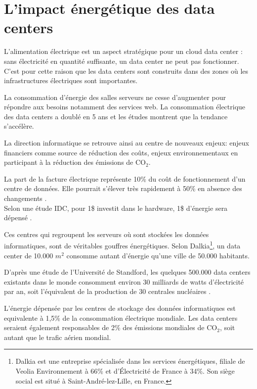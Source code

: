 \section{L'impact énergétique des data centers}
\begin{onehalfspace}
L'alimentation électrique est un aspect stratégique pour un cloud data center : sans électricité en quantité suffisante, un data center ne peut pas fonctionner. C'est pour cette raison que les data centers sont construits dans des zones où les infrastructures électriques sont importantes.\medskip 

La consommation d'énergie des salles serveurs ne cesse d'augmenter pour répondre aux besoins notamment des services web. La consommation électrique des data centers a doublé en 5 ans et les études montrent que la tendance s'accélère.\medskip 

La direction informatique se retrouve ainsi au centre de nouveaux enjeux: enjeux financiers comme source de réduction des coûts, enjeux environnementaux en participant à la réduction des émissions de CO$_{2}$. \medskip 

La part de la facture électrique représente 10\% du coût de fonctionnement d'un centre de données. Elle pourrait s'élever très rapidement à 50\% en absence des changements \cite{WEB1}.\medskip \\
Selon une étude IDC, pour 1\$ investit dans le hardware, 1\$ d'énergie sera dépensé \cite{WEB1}.\medskip 

Ces centres qui regroupent les serveurs où sont stockées les données informatiques, sont de véritables gouffres énergétiques. Selon Dalkia\footnote{Dalkia est une entreprise spécialisée dans les services énergétiques, filiale de Veolia Environnement à 66\% et d'Électricité de France à 34\%. Son siège social est situé à Saint-André-lez-Lille, en France.}, un data center de 10.000 $m^{2}$ consomme autant d'énergie qu'une ville de 50.000 habitants.\medskip 

D'après une étude de l'Université de Standford, les quelques 500.000 data centers  existants dans le monde consomment environ 30 milliards de watts d'électricité par an, soit l'équivalent de la production de 30 centrales nucléaires \cite{ref6}.\medskip 

L'énergie dépensée par les centres de stockage des données informatiques est equivalente à 1,5\% de la consommation électrique mondiale. Les data centers seraient également responsables de 2\% des émissions mondiales de CO$_{2}$, soit autant que le trafic aérien mondial.\medskip 


\end{onehalfspace}
